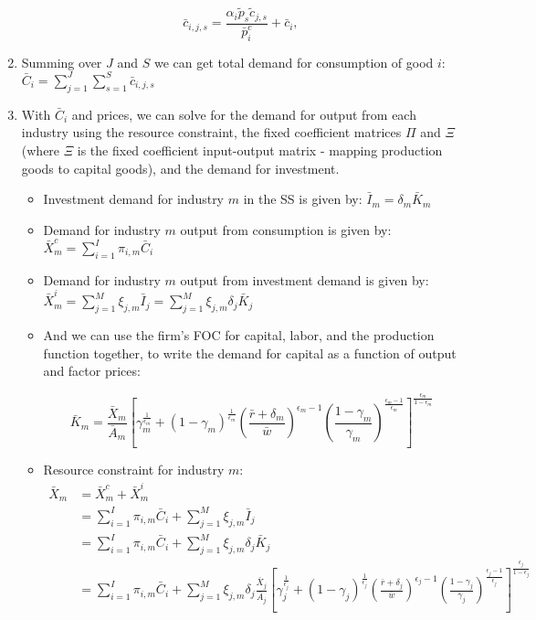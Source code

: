 \documentclass[letterpaper,12pt]{article}
\theoremstyle{definition}
\begin{document}
\begin{spacing}{1.5}
\begin{enumerate}
\begin{equation}
\bar{c}_{i,j,s}  = \frac{\alpha_{i} \tilde{p}_{s}\tilde{c}_{j,s}}{\bar{p}^{c}_{i}} + \bar{c}_{i},
\end{equation}

\item Summing over $J$ and $S$ we can get total demand for consumption of good $i$: $\bar{C}_{i} = \sum_{j=1}^{J}\sum_{s=1}^{S} \bar{c}_{i,j,s}$
\item With $\bar{C}_{i}$ and prices, we can solve for the demand for output from each industry using the resource constraint, the fixed coefficient matrices $\Pi$ and $\Xi$ (where $\Xi$ is the fixed coefficient input-output matrix - mapping production goods to capital goods), and the demand for investment.
	\begin{itemize}
	\item Investment demand for industry $m$ in the SS is given by: $\bar{I}_{m} = \delta_{m}\bar{K}_{m}$
	\item Demand for industry $m$ output from consumption is given by: $\bar{X}^{c}_{m} = \sum_{i=1}^{I} \pi_{i,m}\bar{C}_{i}$
	\item Demand for industry $m$ output from investment demand is given by: $\bar{X}^{i}_{m} =  \sum_{j=1}^{M} \xi_{j,m}\bar{I}_{j} = \sum_{j=1}^{M} \xi_{j,m}\delta_{j}\bar{K}_{j} $
	\item And we can use the firm's FOC for capital, labor, and the production function together,  to write the demand for capital as a function of output and factor prices: 
	
	\begin{equation}
	\label{eqn:k_demand2}
	\bar{K}_{m} = \frac{\bar{X}_{m}}{\bar{A}_{m}}\left[\gamma_{m}^{\frac{1}{\epsilon_{m}}}+(1-\gamma_{m})^{\frac{1}{\epsilon_{m}}}\left(\frac{\bar{r}+\delta_{m}}{\bar{w}}\right)^{\epsilon_{m}-1}\left(\frac{1-\gamma_{m}}{\gamma_{m}}	\right)^{\frac{\epsilon_{m}-1}{\epsilon_{m}}}\right]^{\frac{\epsilon_{m}}{1-\epsilon_{m}}}
	\end{equation}
	
	\item Resource constraint for industry $m$: 
	\begin{equation}
	\begin{split}
	\bar{X}_{m} &= \bar{X}^{c}_{m} + \bar{X}^{i}_{m} \\
	&= \sum_{i=1}^{I} \pi_{i,m}\bar{C}_{i} +\sum_{j=1}^{M} \xi_{j,m}\bar{I}_{j} \\
	 &= \sum_{i=1}^{I} \pi_{i,m}\bar{C}_{i} +\sum_{j=1}^{M} \xi_{j,m}\delta_{j}\bar{K}_{j}  \\
	 &= \sum_{i=1}^{I} \pi_{i,m}\bar{C}_{i} +\sum_{j=1}^{M} \xi_{j,m}\delta_{j} \frac{\bar{X}_{j}}{\bar{A}_{j}}\left[\gamma_{j}^{\frac{1}{\epsilon_{j}}}+(1-\gamma_{j})^{\frac{1}{\epsilon_{j}}}\left(\frac{\bar{r}+\delta_{j}}{\bar{w}}\right)^{\epsilon_{j}-1}\left(\frac{1-\gamma_{j}}{\gamma_{j}}	\right)^{\frac{\epsilon_{j}-1}{\epsilon_{j}}}\right]^{\frac{\epsilon_{j}}{1-\epsilon_{j}}}
	\end{split}
	\end{equation}
	

\end{itemize}
\end{enumerate}
\end{spacing}
\end{document}
